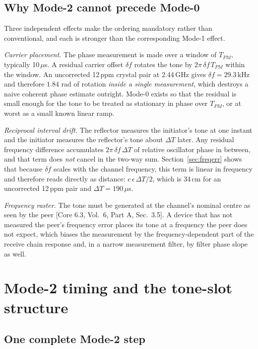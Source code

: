 \documentclass[11pt,a4paper]{article}
\newcommand{\us}{\,\ensuremath{\upmu}s}
\newcommand{\Tpm}{T_{PM}}
\providecommand{\upmu}{\mu}
\newcommand{\core}[1]{\textcolor{rulegrey}{\small[Core 6.3, #1]}}
\begin{document}
\subsection{Why Mode-2 cannot precede Mode-0}

Three independent effects make the ordering mandatory rather than conventional, and each is stronger
than the corresponding Mode-1 effect.

\emph{Carrier placement.} The phase measurement is made over a window of $\Tpm$, typically
10\us. A residual carrier offset $\delta f$ rotates the tone by $2\pi\,\delta f\,\Tpm$ within the
window. An uncorrected 12\,ppm crystal pair at 2.44\,GHz gives $\delta f = 29.3$\,kHz and therefore
$1.84$ rad of rotation \emph{inside a single measurement}, which destroys a naive coherent phase
estimate outright. Mode-0 exists so that the residual is small enough for the tone to be treated as
stationary in phase over $\Tpm$, or at worst as a small known linear ramp.

\emph{Reciprocal interval drift.} The reflector measures the initiator's tone at one instant and the
initiator measures the reflector's tone about $\Delta T$ later. Any residual frequency difference
accumulates $2\pi\,\delta f\,\Delta T$ of relative oscillator phase in between, and that term does
\emph{not} cancel in the two-way sum. Section~\ref{sec:freqerr} shows that because $\delta f$ scales
with the channel frequency, this term is linear in frequency and therefore reads directly as
distance: $c\,\epsilon\,\Delta T/2$, which is 34\,cm for an uncorrected 12\,ppm pair and
$\Delta T = 190$\us.

\emph{Frequency raster.} The tone must be generated at the channel's nominal centre as seen by the
peer \core{Vol.\ 6, Part A, Sec.\ 3.5}. A device that has not measured the peer's frequency error
places its tone at a frequency the peer does not expect, which biases the measurement by the
frequency-dependent part of the receive chain response and, in a narrow measurement filter, by
filter phase slope as well.

\section{Mode-2 timing and the tone-slot structure}
\label{sec:timing}

\subsection{One complete Mode-2 step}
\end{document}
